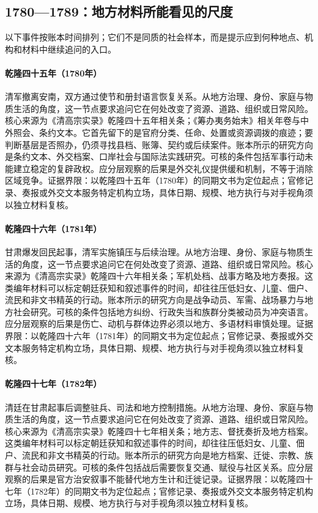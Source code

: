 \subsection{1780—1789：地方材料所能看见的尺度}
以下事件按账本时间排列；它们不是同质的社会样本，而是提示应到何种地点、机构和材料中继续追问的入口。
\hypertarget{social:EQ-1780-VIETNAM-WITHDRAWAL}{}\paragraph{乾隆四十五年（1780年）}清军撤离安南，双方通过使节和册封语言恢复关系。从地方治理、身份、家庭与物质生活的角度，这一节点要求追问它在何处改变了资源、道路、组织或日常风险。核心来源为《清高宗实录》乾隆四十五年相关条；《筹办夷务始末》相关年卷与中外照会、条约文本。它首先留下的是官府分类、任命、处置或资源调拨的痕迹；要判断基层是否照办，仍须寻找县档、账簿、契约或后续案件。账本所示的研究方向是条约文本、外交档案、口岸社会与国际法实践研究。可核的条件包括军事行动未能建立稳定的复辟政权。应分层观察的后果是外交礼仪提供缓和机制，不等于消除区域竞争。证据界限：以乾隆四十五年（1780年）的同期文书为定位起点；官修记录、奏报或外交文本服务特定机构立场，具体日期、规模、地方执行与对手视角须以独立材料复核。
\hypertarget{social:EQ-1781-GANSU-MUSLIM-UPRISING}{}\paragraph{乾隆四十六年（1781年）}甘肃爆发回民起事，清军实施镇压与后续治理。从地方治理、身份、家庭与物质生活的角度，这一节点要求追问它在何处改变了资源、道路、组织或日常风险。核心来源为《清高宗实录》乾隆四十六年相关条；军机处档、战事方略及地方奏报。这类编年材料可以标定朝廷获知和叙述事件的时间，却往往压低妇女、儿童、佃户、流民和非文书精英的行动。账本所示的研究方向是战争动员、军需、战场暴力与地方社会研究。可核的条件包括地方纠纷、行政失当和族群分类被动员为冲突语言。应分层观察的后果是伤亡、动机与群体边界必须以地方、多语材料审慎处理。证据界限：以乾隆四十六年（1781年）的同期文书为定位起点；官修记录、奏报或外交文本服务特定机构立场，具体日期、规模、地方执行与对手视角须以独立材料复核。
\hypertarget{social:EQ-1782-GANSU-POSTWAR-GOVERNANCE}{}\paragraph{乾隆四十七年（1782年）}清廷在甘肃起事后调整驻兵、司法和地方控制措施。从地方治理、身份、家庭与物质生活的角度，这一节点要求追问它在何处改变了资源、道路、组织或日常风险。核心来源为《清高宗实录》乾隆四十七年相关条；地方志、督抚奏折及地方档案。这类编年材料可以标定朝廷获知和叙述事件的时间，却往往压低妇女、儿童、佃户、流民和非文书精英的行动。账本所示的研究方向是地方档案、迁徙、宗教、族群与社会动员研究。可核的条件包括战后需要恢复交通、赋役与社区关系。应分层观察的后果是官方治安叙事不能替代地方生计和迁徙记录。证据界限：以乾隆四十七年（1782年）的同期文书为定位起点；官修记录、奏报或外交文本服务特定机构立场，具体日期、规模、地方执行与对手视角须以独立材料复核。
